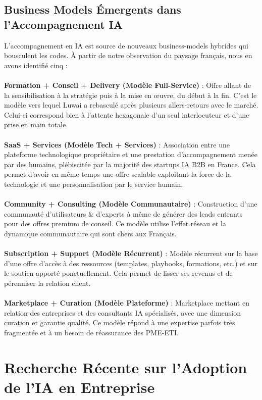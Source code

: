 \subsection{Business Models Émergents dans l'Accompagnement IA}
L’accompagnement en IA est source de nouveaux business-models hybrides qui bousculent les codes. À partir de notre observation du paysage français, nous en avons identifié cinq :
\\\\
\textbf{Formation + Conseil + Delivery (Modèle Full-Service)} : Offre allant de la sensibilisation à la stratégie puis à la mise en œuvre, du début à la fin. C’est le modèle vers lequel Luwai a rebasculé après plusieurs allers-retours avec le marché. Celui-ci correspond bien à l’attente hexagonale d’un seul interlocuteur et d’une prise en main totale.
\\\\
\textbf{SaaS + Services (Modèle Tech + Services)} : Association entre une plateforme technologique propriétaire et une prestation d’accompagnement menée par des humains, plébiscitée par la majorité des startups IA B2B en France. Cela permet d’avoir en même temps une offre scalable exploitant la force de la technologie et une personnalisation par le service humain.
\\\\
\textbf{Community + Consulting (Modèle Communautaire)} : Construction d’une communauté d’utilisateurs \& d’experts à même de générer des leads entrants pour des offres premium de conseil. Ce modèle utilise l’effet réseau et la dynamique communautaire qui sont chers aux Français.
\\\\
\textbf{Subscription + Support (Modèle Récurrent)} : Modèle récurrent sur la base d’une offre d’accès à des ressources (templates, playbooks, formations, etc.) et sur le soutien apporté ponctuellement. Cela permet de lisser ses revenus et de pérenniser la relation client.
\\\\
\textbf{Marketplace + Curation (Modèle Plateforme)} : Marketplace mettant en relation des entreprises et des consultants IA spécialisés, avec une dimension curation et garantie qualité. Ce modèle répond à une expertise parfois très fragmentée et à un besoin de réassurance des PME-ETI.
\section{Recherche Récente sur l'Adoption de l'IA en Entreprise}

